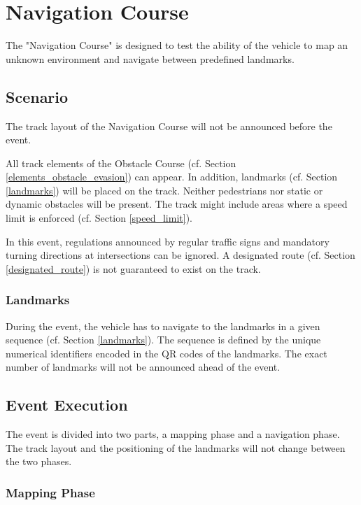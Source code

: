 \section{Navigation Course}
\label{navigation_course}

The "Navigation Course" is designed to test the ability of the vehicle to map an unknown environment and navigate between predefined landmarks.

\subsection{Scenario}

The track layout of the Navigation Course will not be announced before the event.

All track elements of the Obstacle Course (cf. Section \ref{elements_obstacle_evasion}) can appear.
In addition, landmarks (cf. Section \ref{landmarks}) will be placed on the track.
Neither pedestrians nor static or dynamic obstacles will be present.
The track might include areas where a speed limit is enforced (cf. Section \ref{speed_limit}).

In this event, regulations announced by regular traffic signs and mandatory turning directions at intersections can be ignored.
A designated route (cf. Section {\ref{designated_route}}) is not guaranteed to exist on the track.

\subsubsection{Landmarks}

During the event, the vehicle has to navigate to the landmarks in a given sequence (cf. Section \ref{landmarks}).
The sequence is defined by the unique numerical identifiers encoded in the QR codes of the landmarks.
The exact number of landmarks will not be announced ahead of the event.

\subsection{Event Execution}

The event is divided into two parts, a mapping phase and a navigation phase.
The track layout and the positioning of the landmarks will not change between the two phases.

\subsubsection{Mapping Phase}

